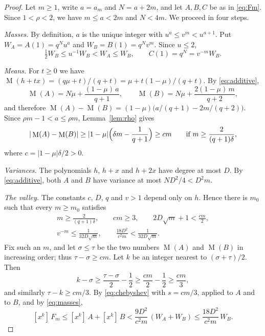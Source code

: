 \documentclass[11pt]{amsart}
\theoremstyle{remark}
\numberwithin{equation}{section}
\newcommand{\coef}[2]{[x^{#1}]\,#2}
\DeclareMathOperator{\M}{M}
\begin{document}
\begin{proof}
Let $m\ge 1$, write $a=a_m$ and $N=a+2m$, and let $A,B,C$ be as in \eqref{eq:Fm}. Since $1<\rho<2$, we have $m\le a<2m$ and $N<4m$. We proceed in four steps.

\emph{Masses.} By definition, $a$ is the unique integer with $u^a\le v^m<u^{a+1}$. Put $W_A=A(1)=q^Nu^a$ and $W_B=B(1)=q^Nv^m$. Since $u\le 2$,
\begin{equation}\label{eq:masses}
\tfrac12 W_B\le u^{-1}W_B<W_A\le W_B,\qquad C(1)=q^N=v^{-m}W_B .
\end{equation}

\emph{Means.} For $t\ge 0$ we have $\M(h+tx)=(q\mu+t)/(q+t)=\mu+t(1-\mu)/(q+t)$. By \eqref{eq:additive},
\[
\M(A)=N\mu+\frac{(1-\mu)\,a}{q+1},\qquad \M(B)=N\mu+\frac{2(1-\mu)\,m}{q+2},
\]
and therefore $\M(A)-\M(B)=(1-\mu)\bigl(a/(q+1)-2m/(q+2)\bigr)$. Since $\rho m-1<a\le\rho m$, Lemma~\ref{lem:rho} gives
\[
|\M(A)-\M(B)|\ge|1-\mu|\Bigl(\delta m-\frac{1}{q+1}\Bigr)\ge cm
\qquad\text{if } m\ge\frac{2}{(q+1)\delta},
\]
where $c=|1-\mu|\delta/2>0$.

\emph{Variances.} The polynomials $h$, $h+x$ and $h+2x$ have degree at most $D$. By \eqref{eq:additive}, both $A$ and $B$ have variance at most $ND^2/4<D^2m$.

\emph{The valley.} The constants $c$, $D$, $q$ and $v>1$ depend only on $h$. Hence there is $m_0$ such that every $m\ge m_0$ satisfies
\begin{equation}\label{eq:conditions}
\begin{gathered}
m\ge\frac{2}{(q+1)\delta},\qquad cm\ge 3,\qquad 2D\sqrt m+1<\frac{cm}{2},\\
v^{-m}\le\frac{1}{32D\sqrt m},\qquad \frac{18D^2}{c^2m}<\frac{1}{32D\sqrt m}.
\end{gathered}
\end{equation}
Fix such an $m$, and let $\sigma\le\tau$ be the two numbers $\M(A)$ and $\M(B)$ in increasing order; thus $\tau-\sigma\ge cm$. Let $k$ be an integer nearest to $(\sigma+\tau)/2$. Then
\[
k-\sigma\ge\frac{\tau-\sigma}{2}-\frac12\ge\frac{cm}{2}-\frac12\ge\frac{cm}{3},
\]
and similarly $\tau-k\ge cm/3$. By \eqref{eq:chebyshev} with $s=cm/3$, applied to $A$ and to $B$, and by \eqref{eq:masses},
\begin{equation}\label{eq:upper}
\coef{k}{F_m}\le\coef{k}{A}+\coef{k}{B}<\frac{9D^2}{c^2m}\,(W_A+W_B)\le\frac{18D^2}{c^2m}\,W_B .
\end{equation}


\end{proof}
\end{document}

